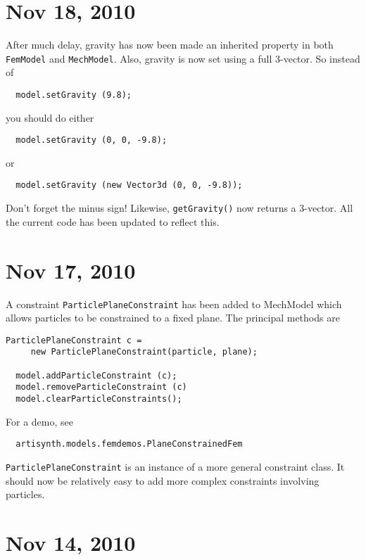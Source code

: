 \documentclass{article}
\begin{document}
\section*{Nov 18, 2010}

After much delay, gravity has now been made an inherited property in
both {\tt FemModel} and {\tt MechModel}. Also, gravity is now set using a full
3-vector. So instead of 

\begin{verbatim}
  model.setGravity (9.8);
\end{verbatim}

you should do either

\begin{verbatim}
  model.setGravity (0, 0, -9.8);
\end{verbatim}

or

\begin{verbatim}
  model.setGravity (new Vector3d (0, 0, -9.8));
\end{verbatim}

Don't forget the minus sign! Likewise, {\tt getGravity()} now returns a
3-vector. All the current code has been updated to reflect this.

\section*{Nov 17, 2010}

A constraint {\tt ParticlePlaneConstraint} has been added to MechModel
which allows particles to be constrained to a fixed plane. The
principal methods are

\begin{lstlisting}[]
  ParticlePlaneConstraint c = 
     new ParticlePlaneConstraint(particle, plane);

  model.addParticleConstraint (c);
  model.removeParticleConstraint (c)
  model.clearParticleConstraints();
\end{lstlisting}

For a demo, see

\begin{verbatim}
  artisynth.models.femdemos.PlaneConstrainedFem
\end{verbatim}

{\tt ParticlePlaneConstraint} is an instance of a more general constraint
class. It should now be relatively easy to add more complex
constraints involving particles.

\section*{Nov 14, 2010}
\end{document}
